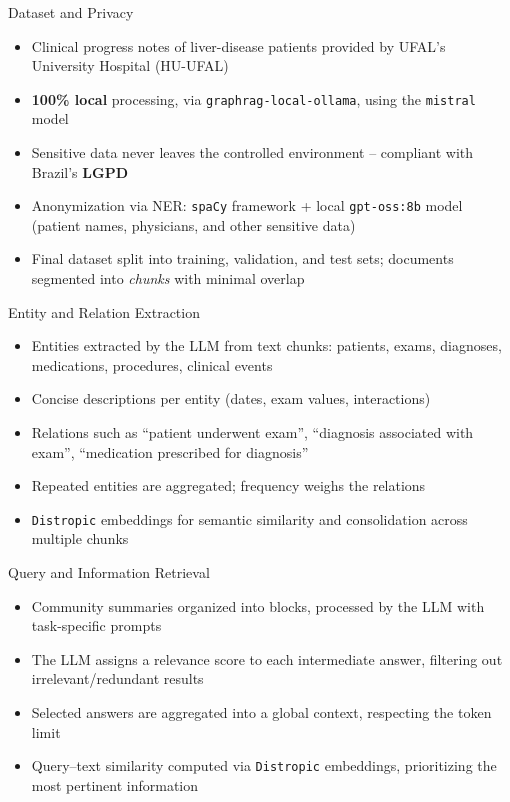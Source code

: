 \documentclass[9pt]{beamer}
\begin{document}
    \begin{frame}{Dataset and Privacy}
        \begin{itemize}
            \item Clinical progress notes of liver-disease patients provided by UFAL's University Hospital (HU-UFAL)
            \item \textbf{100\% local} processing, via \texttt{graphrag-local-ollama}, using the \texttt{mistral} model
            \item Sensitive data never leaves the controlled environment -- compliant with Brazil's \textbf{LGPD}
            \item Anonymization via NER: \texttt{spaCy} framework + local \texttt{gpt-oss:8b} model (patient names, physicians, and other sensitive data)
            \item Final dataset split into training, validation, and test sets; documents segmented into \textit{chunks} with minimal overlap
        \end{itemize}
    \end{frame}

    \begin{frame}{Entity and Relation Extraction}
        \begin{itemize}
            \item Entities extracted by the LLM from text chunks: patients, exams, diagnoses, medications, procedures, clinical events
            \item Concise descriptions per entity (dates, exam values, interactions)
            \item Relations such as ``patient underwent exam'', ``diagnosis associated with exam'', ``medication prescribed for diagnosis''
            \item Repeated entities are aggregated; frequency weighs the relations
            \item \texttt{Distropic} embeddings for semantic similarity and consolidation across multiple chunks
        \end{itemize}
    \end{frame}

    \begin{frame}{Query and Information Retrieval}
        \begin{itemize}
            \item Community summaries organized into blocks, processed by the LLM with task-specific prompts
            \item The LLM assigns a relevance score to each intermediate answer, filtering out irrelevant/redundant results
            \item Selected answers are aggregated into a global context, respecting the token limit
            \item Query--text similarity computed via \texttt{Distropic} embeddings, prioritizing the most pertinent information
        \end{itemize}
    \end{frame}
\end{document}
